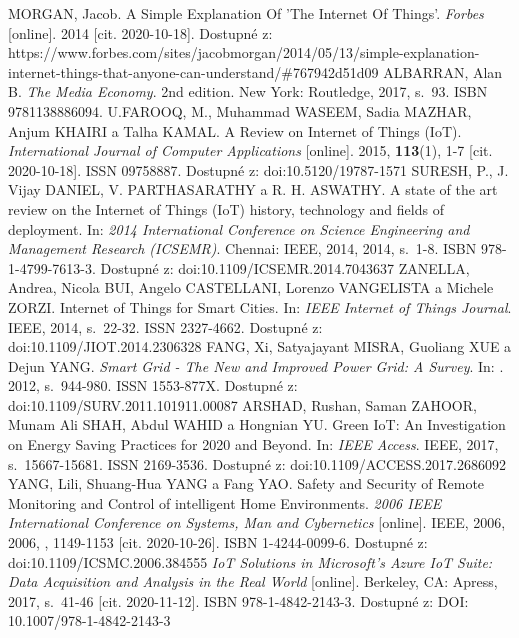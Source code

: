\documentclass[twoside]{ctuthesis}
\theoremstyle{plain}
\theoremstyle{definition}
\theoremstyle{note}
\begin{document}
\printindex

\appendix

\begin{thebibliography}{46}
 MORGAN, Jacob. A Simple Explanation Of 'The Internet Of Things'. \textit{Forbes} [online]. 2014 [cit. 2020-10-18]. Dostupné z: https://www.forbes.com/sites/jacobmorgan/2014/05/13/simple-explanation-internet-things-that-anyone-can-understand/\#767942d51d09
 ALBARRAN, Alan B. \textit{The Media Economy}. 2nd edition. New York: Routledge, 2017, s.~93. ISBN 9781138886094.
U.FAROOQ, M., Muhammad WASEEM, Sadia MAZHAR, Anjum KHAIRI a Talha KAMAL. A Review on Internet of Things (IoT). \textit{International Journal of Computer Applications} [online]. 2015, \textbf{113}(1), 1-7 [cit. 2020-10-18]. ISSN 09758887. Dostupné z: doi:10.5120/19787-1571
SURESH, P., J. Vijay DANIEL, V. PARTHASARATHY a R. H. ASWATHY. A state of the art review on the Internet of Things (IoT) history, technology and fields of deployment. In: \textit{2014 International Conference on Science Engineering and Management Research (ICSEMR)}. Chennai: IEEE, 2014, 2014, s.~1-8. ISBN 978-1-4799-7613-3. Dostupné z: doi:10.1109/ICSEMR.2014.7043637
 ZANELLA, Andrea, Nicola BUI, Angelo CASTELLANI, Lorenzo VANGELISTA a Michele ZORZI. Internet of Things for Smart Cities. In: \textit{IEEE Internet of Things Journal}. IEEE, 2014, s.~22-32. ISSN 2327-4662. Dostupné z: doi:10.1109/JIOT.2014.2306328
 FANG, Xi, Satyajayant MISRA, Guoliang XUE a Dejun YANG. \textit{Smart Grid - The New and Improved Power Grid: A Survey}. In: . 2012, s.~944-980. ISSN 1553-877X. Dostupné z: doi:10.1109/SURV.2011.101911.00087
ARSHAD, Rushan, Saman ZAHOOR, Munam Ali SHAH, Abdul WAHID a Hongnian YU. Green IoT: An Investigation on Energy Saving Practices for 2020 and Beyond. In: \textit{IEEE Access}. IEEE, 2017, s.~15667-15681. ISSN 2169-3536. Dostupné z: doi:10.1109/ACCESS.2017.2686092
 YANG, Lili, Shuang-Hua YANG a Fang YAO. Safety and Security of Remote Monitoring and Control of intelligent Home Environments. \textit{2006 IEEE International Conference on Systems, Man and Cybernetics} [online]. IEEE, 2006, 2006, , 1149-1153 [cit. 2020-10-26]. ISBN 1-4244-0099-6. Dostupné z: doi:10.1109/ICSMC.2006.384555
   \textit{IoT Solutions in Microsoft's Azure IoT Suite: Data Acquisition and Analysis in the Real World} [online]. Berkeley, CA: Apress, 2017, s.~41-46 [cit. 2020-11-12]. ISBN 978-1-4842-2143-3. Dostupné z: DOI: 10.1007/978-1-4842-2143-3

\end{thebibliography}
\end{document}
